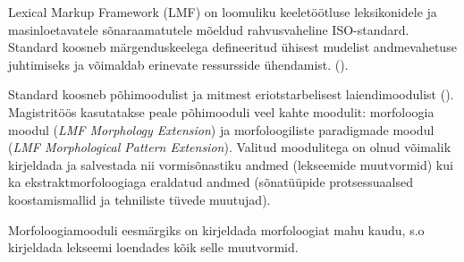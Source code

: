 \documentclass[12pt,a4paper]{article}
\begin{document}

Lexical Markup Framework (LMF) on loomuliku keeletöötluse leksikonidele ja masin\-loetavatele sõna\-raamatutele mõeldud rahvusvaheline ISO-standard. Standard koosneb märgenduskeelega defineeritud ühisest mudelist andmevahetuse juhtimiseks ja võimaldab erinevate ressursside ühendamist. (\cite[1]{francopoulo_lmf_2013}).

Standard koosneb põhimoodulist ja mitmest eri\-otstarbelisest laiendi\-moodulist (\cite[22]{francopoulo_lmf_2013}). Magistritöös kasutatakse peale põhimooduli veel kahte moodulit: morfoloogia moodul (\textit{LMF Morphology Extension}) ja morfoloogiliste paradigmade moodul (\textit{LMF Morphological Pattern Extension}). Valitud moodulitega on olnud võimalik kirjeldada ja salvestada nii vormisõnastiku andmed (lekseemide muutvormid) kui ka ekstrakt\-morfoloogiaga eraldatud andmed (sõnatüüpide protsessuaalsed koostamis\-mallid ja tehniliste tüvede muutujad).

Morfoloogiamooduli eesmärgiks on kirjeldada morfoloogiat mahu kaudu, s.o kirjeldada lekseemi loendades kõik selle muutvormid.
\end{document}
